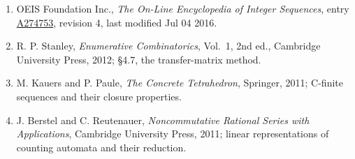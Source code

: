 \documentclass[11pt]{article}
\theoremstyle{definition}
\begin{document}
\begin{enumerate}

\item OEIS Foundation Inc., \emph{The On-Line Encyclopedia of Integer Sequences}, entry \href{https://oeis.org/A274753}{A274753}, revision 4, last modified Jul 04 2016.

\item R. P. Stanley, \emph{Enumerative Combinatorics}, Vol.~1, 2nd ed., Cambridge University Press, 2012; \S4.7, the transfer-matrix method.

\item M. Kauers and P. Paule, \emph{The Concrete Tetrahedron}, Springer, 2011; C-finite sequences and their closure properties.

\item J. Berstel and C. Reutenauer, \emph{Noncommutative Rational Series with Applications}, Cambridge University Press, 2011; linear representations of counting automata and their reduction.

\end{enumerate}
\end{document}
